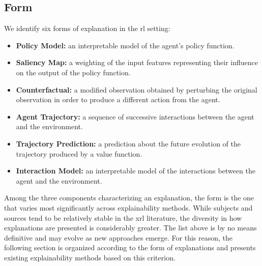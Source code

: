 \subsection{Form}
\label{subsec:form}

We identify six forms of explanation in the \gls{rl} setting:
\begin{itemize}
    \item \textbf{Policy Model:} an interpretable model of the agent's policy function.
    
    \item \textbf{Saliency Map:} a weighting of the input features representing their influence on the output of the policy function.
    
    \item \textbf{Counterfactual:} a modified observation obtained by perturbing the original observation in order to produce a different action from the agent.
    
    \item \textbf{Agent Trajectory:} a sequence of successive interactions between the agent and the environment.
    
    \item \textbf{Trajectory Prediction:} a prediction about the future evolution of the trajectory produced by a value function.
    
    \item \textbf{Interaction Model:} an interpretable model of the interactions between the agent and the environment.
\end{itemize}

Among the three components characterizing an explanation, the form is the one that varies most significantly across explainability methods.
While subjects and sources tend to be relatively stable in the \gls{xrl} literature, the diversity in how explanations are presented is considerably greater.
The list above is by no means definitive and may evolve as new approaches emerge.
For this reason, the following section is organized according to the form of explanations and presents existing explainability methods based on this criterion.
